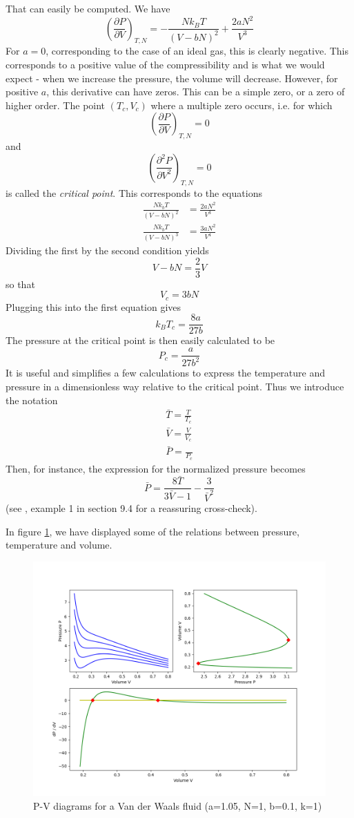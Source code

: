 \documentclass[a4paper, draft]{article}
\theoremstyle{own}
\theoremstyle{remark}
\begin{document}
That can easily be computed. We have
$$
(\frac{\partial P}{\partial V})_{T,N} = - \frac{N k_B T}{(V - bN)^2} + \frac{2aN^2}{V^3}
$$
For $a = 0$, corresponding to the case of an ideal gas, this is clearly negative. This corresponds to a positive value of the compressibility and is what we would expect - when we increase the pressure, the volume will decrease. However, for positive $a$, this derivative can have zeros. This can be a simple zero, or a zero of higher order. The point $(T_c, V_c)$ where a multiple zero occurs, i.e. for which
$$
(\frac{\partial P}{\partial V})_{T,N}  = 0
$$
and
$$
(\frac{\partial^2 P}{\partial V^2})_{T,N}  = 0
$$
is called the {\em critical point}. This corresponds to the equations
\begin{align*}
\frac{N k_b T}{(V-bN)^2} &= \frac{2aN^2}{V^3} \\
\frac{N k_b T}{(V-bN)^3} &= \frac{3aN^2}{V^4} 
\end{align*}
Dividing the first by the second condition yields
$$
V - bN = \frac{2}{3} V
$$
so that 
$$
V_c = 3 b N
$$
Plugging this into the first equation gives
$$
k_B T_c =  \frac{8a}{27b}
$$
The pressure at the critical point is then easily calculated to be
$$
P_c = \frac{a}{27b^2}
$$
It is useful and simplifies a few calculations to express the temperature and pressure in a dimensionless way relative to the critical point. Thus we introduce the notation
\begin{align*}
\bar{T} = \frac{T}{T_c} \\
\bar{V} = \frac{V}{V_c} \\
\bar{P} = \frac{}{P_c} 
\end{align*}
Then, for instance, the expression for the normalized pressure becomes
$$
\bar{P} = \frac{8 \bar{T}}{3 \bar{V}-1} - \frac{3}{\bar{V}^2}
$$
(see \cite{Callen}, example 1 in section 9.4 for a reassuring cross-check).

In figure \ref{fig:VanDerWaals}, we have displayed some of the relations between pressure, temperature and volume. 


\begin{figure}[ht]
\centering
\includegraphics[scale=.5]{VanDerWaals}
\caption{P-V diagrams for a Van der Waals fluid (a=1.05, N=1, b=0.1, k=1)}
\label{fig:VanDerWaals}
\end{figure}
\end{document}
